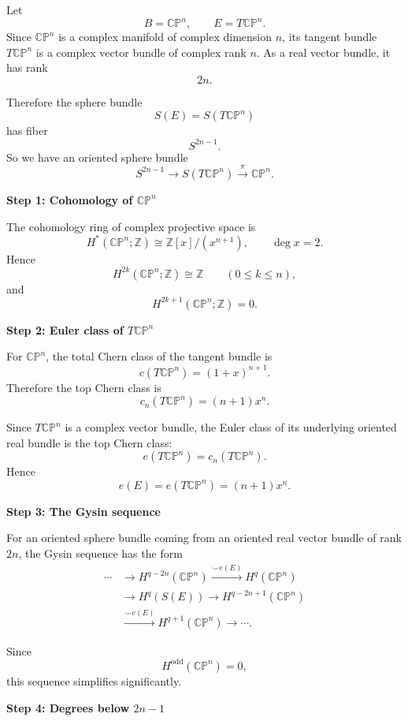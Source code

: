 \begin{solution}
Let
\[
B=\mathbb{CP}^n,
\qquad
E=T\mathbb{CP}^n.
\]
Since \(\mathbb{CP}^n\) is a complex manifold of complex dimension \(n\), its
tangent bundle \(T\mathbb{CP}^n\) is a complex vector bundle of complex rank
\(n\). As a real vector bundle, it has rank
\[
2n.
\]

Therefore the sphere bundle
\[
S(E)=S(T\mathbb{CP}^n)
\]
has fiber
\[
S^{2n-1}.
\]
So we have an oriented sphere bundle
\[
S^{2n-1}
\longrightarrow
S(T\mathbb{CP}^n)
\xrightarrow{\ \pi\ }
\mathbb{CP}^n.
\]


\medskip
\noindent\textbf{Step 1: Cohomology of \(\mathbb{CP}^n\)}\par
\smallskip


The cohomology ring of complex projective space is
\[
H^*(\mathbb{CP}^n;\mathbb Z)
\cong
\mathbb Z[x]/(x^{n+1}),
\qquad
\deg x=2.
\]
Hence
\[
H^{2k}(\mathbb{CP}^n;\mathbb Z)\cong \mathbb Z
\qquad
(0\le k\le n),
\]
and
\[
H^{2k+1}(\mathbb{CP}^n;\mathbb Z)=0.
\]


\medskip
\noindent\textbf{Step 2: Euler class of \(T\mathbb{CP}^n\)}\par
\smallskip


For \(\mathbb{CP}^n\), the total Chern class of the tangent bundle is
\[
c(T\mathbb{CP}^n)=(1+x)^{n+1}.
\]
Therefore the top Chern class is
\[
c_n(T\mathbb{CP}^n)=(n+1)x^n.
\]

Since \(T\mathbb{CP}^n\) is a complex vector bundle, the Euler class of its
underlying oriented real bundle is the top Chern class:
\[
e(T\mathbb{CP}^n)=c_n(T\mathbb{CP}^n).
\]
Hence
\[
e(E)
=
e(T\mathbb{CP}^n)
=
(n+1)x^n.
\]


\medskip
\noindent\textbf{Step 3: The Gysin sequence}\par
\smallskip


For an oriented sphere bundle coming from an oriented real vector bundle of rank
\(2n\), the Gysin sequence has the form
\[
\begin{aligned}
\cdots&\longrightarrow H^{q-2n}(\mathbb{CP}^n)
\xrightarrow{\smile e(E)}H^q(\mathbb{CP}^n)\\
&\longrightarrow H^q(S(E))
\longrightarrow H^{q-2n+1}(\mathbb{CP}^n)\\
&\xrightarrow{\smile e(E)}H^{q+1}(\mathbb{CP}^n)
\longrightarrow\cdots .
\end{aligned}
\]

Since
\[
H^{\text{odd}}(\mathbb{CP}^n)=0,
\]
this sequence simplifies significantly.


\medskip
\noindent\textbf{Step 4: Degrees below \(2n-1\)}\par
\smallskip



\end{solution}
